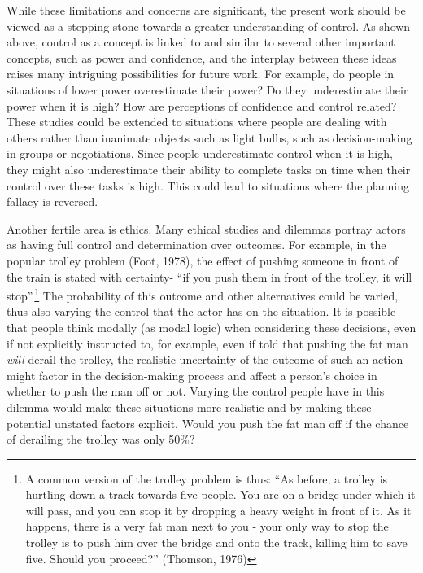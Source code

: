 \documentclass[USenglish,letterpaper,12pt,extrafontsizes,oneside,onecolumn,final]{memoir}
\begin{document}
While these limitations and concerns are significant, the present work should be viewed as a stepping stone towards a greater understanding of control.  As shown above, control as a concept is linked to and similar to several other important concepts, such as power and confidence, and the interplay between these ideas raises many intriguing possibilities for future work.  For example, do people in situations of lower power overestimate their power?  Do they underestimate their power when it is high?  How are perceptions of confidence and control related?  These studies could be extended to situations where people are dealing with others rather than inanimate objects such as light bulbs, such as decision-making in groups or negotiations.  Since people underestimate control when it is high, they might also underestimate their ability to complete tasks on time when their control over these tasks is high.  This could lead to situations where the planning fallacy is reversed.  

Another fertile area is ethics.  Many ethical studies and dilemmas portray actors as having full control and determination over outcomes.  For example, in the popular trolley problem (Foot, 1978), the effect of pushing someone in front of the train is stated with certainty- ``if you push them in front of the trolley, it will stop''.\footnote{A common version of the trolley problem is thus: ``As before, a trolley is hurtling down a track towards five people. You are on a bridge under which it will pass, and you can stop it by dropping a heavy weight in front of it. As it happens, there is a very fat man next to you - your only way to stop the trolley is to push him over the bridge and onto the track, killing him to save five. Should you proceed?'' (Thomson, 1976)}  The probability of this outcome and other alternatives could be varied, thus also varying the control that the actor has on the situation.  It is possible that people think modally (as modal logic) when considering these decisions, even if not explicitly instructed to, for example, even if told that pushing the fat man \emph{will} derail the trolley, the realistic uncertainty of the outcome of such an action might factor in the decision-making process and affect a person's choice in whether to push the man off or not.  Varying the control people have in this dilemma would make these situations more realistic and by making these potential unstated factors explicit.  Would you push the fat man off if the chance of derailing the trolley was only 50\%?  
\end{document}
